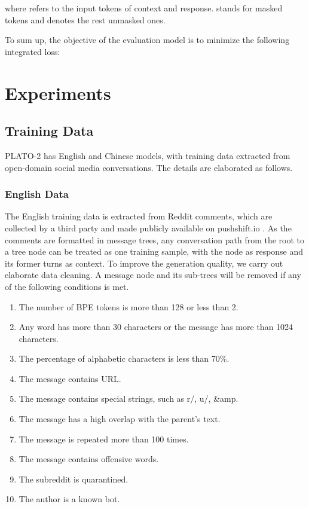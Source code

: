\documentclass[11pt,a4paper]{article}
\begin{document}
	where  refers to the input tokens of context and response.  stands for masked tokens and  denotes the rest unmasked ones.
	
	To sum up, the objective of the evaluation model is to minimize the following integrated loss:
	
	
	\section{Experiments}
	\subsection{Training Data}
	PLATO-2 has English and Chinese models, with training data extracted from open-domain social media conversations. The details are elaborated as follows.
	
	\subsubsection{English Data}
	The English training data is extracted from Reddit comments, which are collected by a third party and made publicly available on pushshift.io \cite{baumgartner2020pushshift}. As the comments are formatted in message trees, any conversation path from the root to a tree node can be treated as one training sample, with the node as response and its former turns as context. To improve the generation quality, we carry out elaborate data cleaning. A message node and its sub-trees will be removed if any of the following conditions is met.
	\begin{enumerate}[label=\arabic*),leftmargin=*,noitemsep,topsep=0pt]
		\item The number of BPE tokens is more than 128 or less than 2.
		\item Any word has more than 30 characters or the message has more than 1024 characters.
		\item The percentage of alphabetic characters is less than 70\%.
		\item The message contains URL.
		\item The message contains special strings, such as r/, u/, \&amp.
		\item The message has a high overlap with the parent's text.
		\item The message is repeated more than 100 times.
		\item The message contains offensive words.
		\item The subreddit is quarantined.
		\item The author is a known bot.
	\end{enumerate}
	
\end{document}
